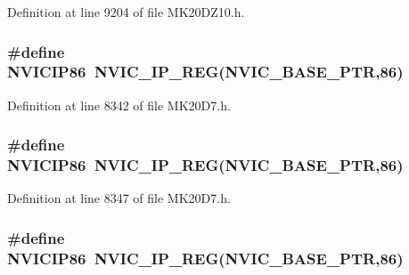 Definition at line 9204 of file M\+K20\+D\+Z10.\+h.

\subsubsection[{\texorpdfstring{N\+V\+I\+C\+I\+P86}{NVICIP86}}]{\setlength{\rightskip}{0pt plus 5cm}\#define N\+V\+I\+C\+I\+P86~{\bf N\+V\+I\+C\+\_\+\+I\+P\+\_\+\+R\+EG}({\bf N\+V\+I\+C\+\_\+\+B\+A\+S\+E\+\_\+\+P\+TR},86)}\hypertarget{group___n_v_i_c___register___accessor___macros_ga390f15921444a9e2b3e1ea3bf56326f7}{}\label{group___n_v_i_c___register___accessor___macros_ga390f15921444a9e2b3e1ea3bf56326f7}


Definition at line 8342 of file M\+K20\+D7.\+h.

\subsubsection[{\texorpdfstring{N\+V\+I\+C\+I\+P86}{NVICIP86}}]{\setlength{\rightskip}{0pt plus 5cm}\#define N\+V\+I\+C\+I\+P86~{\bf N\+V\+I\+C\+\_\+\+I\+P\+\_\+\+R\+EG}({\bf N\+V\+I\+C\+\_\+\+B\+A\+S\+E\+\_\+\+P\+TR},86)}\hypertarget{group___n_v_i_c___register___accessor___macros_ga390f15921444a9e2b3e1ea3bf56326f7}{}\label{group___n_v_i_c___register___accessor___macros_ga390f15921444a9e2b3e1ea3bf56326f7}


Definition at line 8347 of file M\+K20\+D7.\+h.

\subsubsection[{\texorpdfstring{N\+V\+I\+C\+I\+P86}{NVICIP86}}]{\setlength{\rightskip}{0pt plus 5cm}\#define N\+V\+I\+C\+I\+P86~{\bf N\+V\+I\+C\+\_\+\+I\+P\+\_\+\+R\+EG}({\bf N\+V\+I\+C\+\_\+\+B\+A\+S\+E\+\_\+\+P\+TR},86)}\hypertarget{group___n_v_i_c___register___accessor___macros_ga390f15921444a9e2b3e1ea3bf56326f7}{}\label{group___n_v_i_c___register___accessor___macros_ga390f15921444a9e2b3e1ea3bf56326f7}


